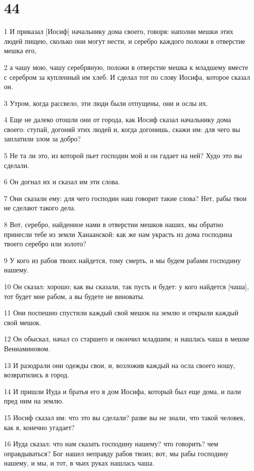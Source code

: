 \chapter{44}

\par 1 И приказал [Иосиф] начальнику дома своего, говоря: наполни мешки этих людей пищею, сколько они могут нести, и серебро каждого положи в отверстие мешка его,
\par 2 а чашу мою, чашу серебряную, положи в отверстие мешка к младшему вместе с серебром за купленный им хлеб. И сделал тот по слову Иосифа, которое сказал он.
\par 3 Утром, когда рассвело, эти люди были отпущены, они и ослы их.
\par 4 Еще не далеко отошли они от города, как Иосиф сказал начальнику дома своего: ступай, догоняй этих людей и, когда догонишь, скажи им: для чего вы заплатили злом за добро?
\par 5 Не та ли это, из которой пьет господин мой и он гадает на ней? Худо это вы сделали.
\par 6 Он догнал их и сказал им эти слова.
\par 7 Они сказали ему: для чего господин наш говорит такие слова? Нет, рабы твои не сделают такого дела.
\par 8 Вот, серебро, найденное нами в отверстии мешков наших, мы обратно принесли тебе из земли Ханаанской: как же нам украсть из дома господина твоего серебро или золото?
\par 9 У кого из рабов твоих найдется, тому смерть, и мы будем рабами господину нашему.
\par 10 Он сказал: хорошо; как вы сказали, так пусть и будет: у кого найдется [чаша], тот будет мне рабом, а вы будете не виноваты.
\par 11 Они поспешно спустили каждый свой мешок на землю и открыли каждый свой мешок.
\par 12 Он обыскал, начал со старшего и окончил младшим; и нашлась чаша в мешке Вениаминовом.
\par 13 И разодрали они одежды свои, и, возложив каждый на осла своего ношу, возвратились в город.
\par 14 И пришли Иуда и братья его в дом Иосифа, который был еще дома, и пали пред ним на землю.
\par 15 Иосиф сказал им: что это вы сделали? разве вы не знали, что такой человек, как я, конечно угадает?
\par 16 Иуда сказал: что нам сказать господину нашему? что говорить? чем оправдываться? Бог нашел неправду рабов твоих; вот, мы рабы господину нашему, и мы, и тот, в чьих руках нашлась чаша.
